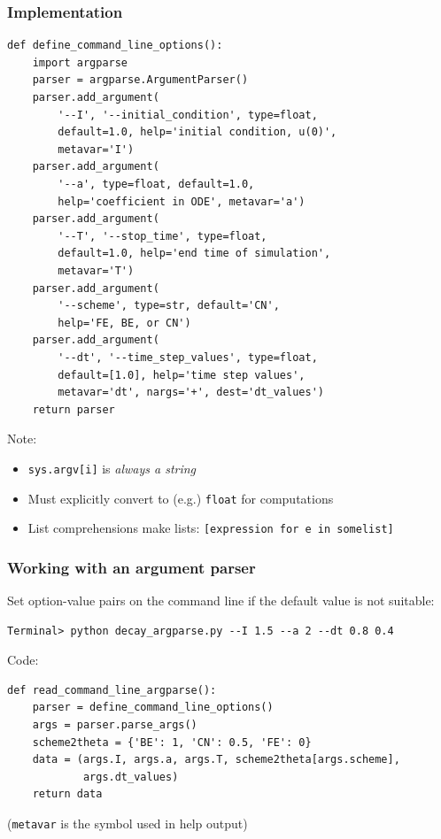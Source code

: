 \documentclass{beamer}
\begin{document}
\begin{frame}
\frametitle{Implementation}

\begin{verbatim}
def define_command_line_options():
    import argparse
    parser = argparse.ArgumentParser()
    parser.add_argument(
        '--I', '--initial_condition', type=float,
        default=1.0, help='initial condition, u(0)',
        metavar='I')
    parser.add_argument(
        '--a', type=float, default=1.0,
        help='coefficient in ODE', metavar='a')
    parser.add_argument(
        '--T', '--stop_time', type=float,
        default=1.0, help='end time of simulation',
        metavar='T')
    parser.add_argument(
        '--scheme', type=str, default='CN',
        help='FE, BE, or CN')
    parser.add_argument(
        '--dt', '--time_step_values', type=float,
        default=[1.0], help='time step values',
        metavar='dt', nargs='+', dest='dt_values')
    return parser
\end{verbatim}

Note:

\begin{itemize}
  \item \texttt{sys.argv[i]} is \emph{always a string}

  \item Must explicitly convert to (e.g.) \texttt{float} for computations

  \item List comprehensions make lists: \texttt{[expression for e in somelist]}
\end{itemize}

\noindent
\end{frame}

\begin{frame}
\frametitle{Working with an argument parser}

Set option-value pairs on the command line if the default value is not
suitable:

\begin{verbatim}
Terminal> python decay_argparse.py --I 1.5 --a 2 --dt 0.8 0.4
\end{verbatim}

Code:

\begin{verbatim}
def read_command_line_argparse():
    parser = define_command_line_options()
    args = parser.parse_args()
    scheme2theta = {'BE': 1, 'CN': 0.5, 'FE': 0}
    data = (args.I, args.a, args.T, scheme2theta[args.scheme],
            args.dt_values)
    return data
\end{verbatim}

(\texttt{metavar} is the symbol used in help output)
\end{frame}
\end{document}
